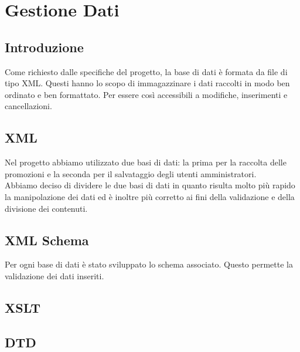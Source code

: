 \section{Gestione Dati}{
	\subsection{Introduzione}
	Come richiesto dalle specifiche del progetto, la base di dati è formata da file di tipo XML. Questi hanno lo scopo di immagazzinare i dati raccolti in modo ben ordinato e ben formattato. Per essere così accessibili a modifiche, inserimenti e cancellazioni.
	\subsection{XML}
	Nel progetto abbiamo utilizzato due basi di dati: la prima per la raccolta delle promozioni e la seconda per il salvataggio degli utenti amministratori.\\
Abbiamo deciso di dividere le due basi di dati in quanto risulta molto più rapido la manipolazione dei dati
ed è inoltre più corretto ai fini della validazione e della divisione dei contenuti.
	\subsection{XML Schema}
	Per ogni base di dati è stato sviluppato lo schema associato. Questo permette la validazione dei dati inseriti.\\
	\subsection{XSLT}
	\subsection{DTD}
}